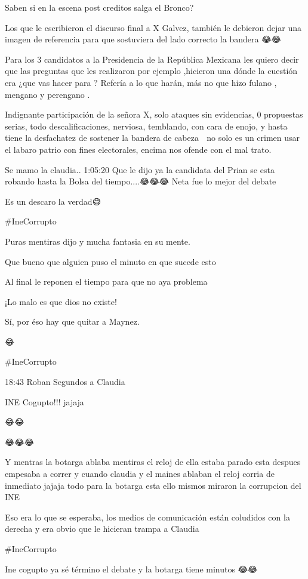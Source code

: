Saben si en la escena post creditos salga el Bronco?

Los que le escribieron el discurso final a X Galvez, también le debieron dejar una imagen de referencia para que sostuviera del lado correcto la bandera 😂😂

Para  los 3  candidatos a la Presidencia de la República Mexicana les quiero decir que las preguntas que les realizaron por ejemplo  ,hicieron una dónde la cuestión era ¿que vas hacer para ?  Refería a lo que harán, más no que hizo fulano , mengano y perengano .

Indignante participación de la señora X, solo ataques sin evidencias, 0 propuestas serias, todo descalificaciones, nerviosa, temblando, con cara de enojo, y hasta tiene la desfachatez de sostener la bandera de cabeza 🤬 no solo es un crimen usar el labaro patrio con fines electorales, encima nos ofende con el mal trato.

Se mamo la claudia.. 1:05:20 Que le dijo ya la candidata del Prian se esta robando hasta la Bolsa del tiempo....😂😂😂 Neta fue lo mejor del debate

Es un descaro la verdad😅

#IneCorrupto

Puras mentiras dijo y mucha fantasia en su mente.

Que bueno que alguien puso el minuto en que sucede esto

Al final le reponen el tiempo para que no aya problema

¡Lo malo es que dios no existe!

Sí, por éso hay que quitar a Maynez.

😂

#IneCorrupto

18:43 Roban Segundos a Claudia 🤬

INE Cogupto!!! jajaja

😂😂

😂😂😂

Y mentras la botarga ablaba mentiras el reloj de ella estaba parado esta despues empesaba a correr y cuando claudia y el maines ablaban el reloj corria de inmediato jajaja todo para la botarga esta ello mismos miraron la corrupcion del INE

Eso era lo que se esperaba, los medios de comunicación están coludidos con la derecha y era obvio que le hicieran trampa a Claudia

#IneCorrupto

Ine cogupto ya sé término el debate y la botarga tiene minutos 😂😂

